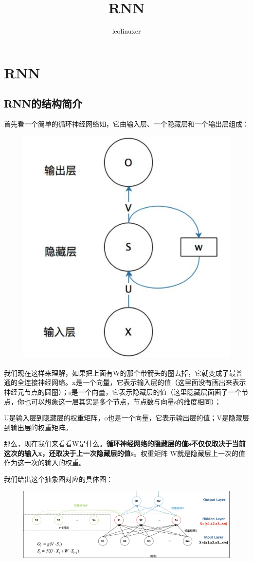 \documentclass[12pt]{article}
\title{RNN \cite{Understand_RNN_In_One_Article_Basics}\cite{Deep_Understand_RNN_And_LSTM}\cite{Everyone_Can_Understand_LSTM}}
\author{leolinuxer}
\begin{document}
\maketitle
\tableofcontents

\section{RNN}
\subsection{RNN的结构简介}
首先看一个简单的循环神经网络如，它由输入层、一个隐藏层和一个输出层组成：
\begin{figure}[H]
    \centering
    \includegraphics[width=.4\textwidth]{fig/RNN_Structure_Simple.png}
\end{figure}

我们现在这样来理解，如果把上面有W的那个带箭头的圈去掉，它就变成了最普通的全连接神经网络。x是一个向量，它表示输入层的值（这里面没有画出来表示神经元节点的圆圈）；s是一个向量，它表示隐藏层的值（这里隐藏层面画了一个节点，你也可以想象这一层其实是多个节点，节点数与向量s的维度相同）；

U是输入层到隐藏层的权重矩阵，o也是一个向量，它表示输出层的值；V是隐藏层到输出层的权重矩阵。

那么，现在我们来看看W是什么。\textbf{循环神经网络的隐藏层的值s不仅仅取决于当前这次的输入x，还取决于上一次隐藏层的值s}。权重矩阵 W就是隐藏层上一次的值作为这一次的输入的权重。

我们给出这个抽象图对应的具体图：
\begin{figure}[H]
    \centering
    \includegraphics[width=1\textwidth]{fig/RNN_Structure_Detail.png}
\end{figure}
\end{document}
